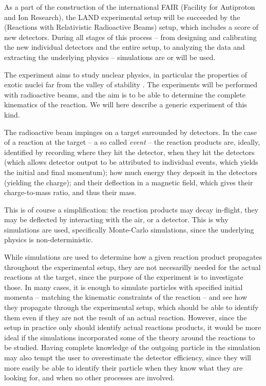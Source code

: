 As a part of the construction of the international FAIR (Facility for Antiproton and Ion Research), the LAND experimental setup will be succeeded by the \rtb{} (Reactions with Relativistic Radioactive Beams) setup, which includes a score of new detectors. During all stages of this process -- from designing and calibrating the new individual detectors and the entire setup, to analyzing the data and extracting the underlying physics -- simulations are or will be used. 

The \rtb{} experiment aims to study nuclear physics, in particular the properties of exotic nuclei far from the valley of stability \cite{r3b:online}. The experiments will be performed with radioactive beams, and the aim is to be able to determine the complete kinematics of the reaction. We will here describe a generic experiment of this kind.

The radioactive beam impinges on a target surrounded by detectors. In the case of a reaction at the target -- a so called \emph{event} -- the reaction products are, ideally, identified by recording where they hit the detector, when they hit the detectors (which allows detector output to be attributed to individual events, which yields the initial and final momentum); how much energy they deposit in the detectors (yielding the charge); and their deflection in a magnetic field, which gives their charge-to-mass ratio, and thus their mass. 

This is of course a simplification: the reaction products may decay in-flight, they may be deflected by interacting with the air, or a detector. This is why simulations are used, specifically Monte-Carlo simulations, since the underlying physics is non-deterministic. 

While simulations are used to determine how a given reaction product propagates throughout the experimental setup, they are not necesarilly needed for the actual reactions at the target, since the purpose of the experiment is to investigate those. 
In many cases, it is enough to simulate particles with specified initial momenta -- matching the kinematic constraints of the reaction -- and see how they propagate through the experimental setup, which should be able to identify them even if they are not the result of an actual reaction.
However, since the setup in practice only should identify actual reactions products, it would be more ideal if the simulations incorporated some of the theory around the reactions to be studied. 
Having complete knowledge of the outgoing particle in the simulation may also tempt the user to overestimate the detector efficiency, since they will more easily be able to identify their particle when they know what they are looking for, and when no other processes are involved.

